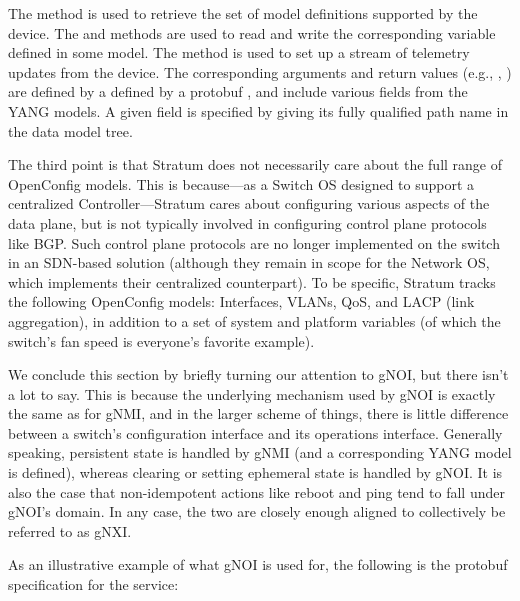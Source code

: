 \documentclass[letterpaper,11pt,english]{sphinxmanual}
\begin{document}
The  method is used to retrieve the set of model
definitions supported by the device. The  and  methods
are used to read and write the corresponding variable defined in some
model. The  method is used to set up a stream of
telemetry updates from the device. The corresponding arguments and
return values (e.g., , ) are defined by a
defined by a protobuf , and include various fields from the
YANG models. A given field is specified by giving its fully qualified
path name in the data model tree.

The third point is that Stratum does not necessarily care about the
full range of OpenConfig models. This is because—as a Switch OS
designed to support a centralized Controller—Stratum cares about
configuring various aspects of the data plane, but is not typically
involved in configuring control plane protocols like BGP. Such control
plane protocols are no longer implemented on the switch in an
SDN-based solution (although they remain in scope for the Network OS,
which implements their centralized counterpart). To be specific,
Stratum tracks the following OpenConfig models: Interfaces, VLANs,
QoS, and LACP (link aggregation), in addition to a set of system and
platform variables (of which the switch’s fan speed is everyone’s
favorite example).

We conclude this section by briefly turning our attention to gNOI, but
there isn’t a lot to say. This is because the underlying mechanism
used by gNOI is exactly the same as for gNMI, and in the larger scheme
of things, there is little difference between a switch’s configuration
interface and its operations interface. Generally speaking, persistent
state is handled by gNMI (and a corresponding YANG model is defined),
whereas clearing or setting ephemeral state is handled by gNOI. It is
also the case that non-idempotent actions like reboot and ping tend to
fall under gNOI’s domain. In any case, the two are closely enough
aligned to collectively be referred to as gNXI.

As an illustrative example of what gNOI is used for, the following is
the protobuf specification for the  service:
\end{document}

